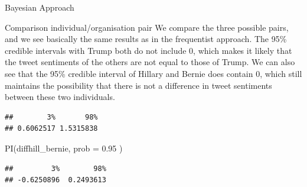 \documentclass[
  ignorenonframetext,
]{beamer}
\newenvironment{Shaded}{\begin{snugshade}}{\end{snugshade}}
\newcommand{\AttributeTok}[1]{\textcolor[rgb]{0.77,0.63,0.00}{#1}}
\newcommand{\CommentTok}[1]{\textcolor[rgb]{0.56,0.35,0.01}{\textit{#1}}}
\newcommand{\DecValTok}[1]{\textcolor[rgb]{0.00,0.00,0.81}{#1}}
\newcommand{\FloatTok}[1]{\textcolor[rgb]{0.00,0.00,0.81}{#1}}
\newcommand{\FunctionTok}[1]{\textcolor[rgb]{0.00,0.00,0.00}{#1}}
\newcommand{\NormalTok}[1]{#1}
\newcommand{\OtherTok}[1]{\textcolor[rgb]{0.56,0.35,0.01}{#1}}
\newcommand{\SpecialCharTok}[1]{\textcolor[rgb]{0.00,0.00,0.00}{#1}}
\begin{document}
\begin{frame}[fragile]{Bayesian Approach}
\begin{block}{Comparison individual/organisation pair}
\protect\hypertarget{comparison-individualorganisation-pair}{}
We compare the three possible pairs, and we see basically the same
results as in the frequentist approach. The 95\% credible intervals with
Trump both do not include 0, which makes it likely that the tweet
sentiments of the others are not equal to those of Trump. We can also
see that the 95\% credible interval of Hillary and Bernie does contain
0, which still maintains the possibility that there is not a difference
in tweet sentiments between these two individuals.

\begin{Shaded}
\end{Shaded}

\begin{verbatim}
##        3%       98% 
## 0.6062517 1.5315838
\end{verbatim}

\begin{Shaded}
\begin{Highlighting}[]
\FunctionTok{PI}\NormalTok{(diffhill\_bernie, }\AttributeTok{prob =} \FloatTok{0.95}\NormalTok{ )}
\end{Highlighting}
\end{Shaded}

\begin{verbatim}
##         3%        98% 
## -0.6250896  0.2493613
\end{verbatim}


\end{block}
\end{frame}
\end{document}
